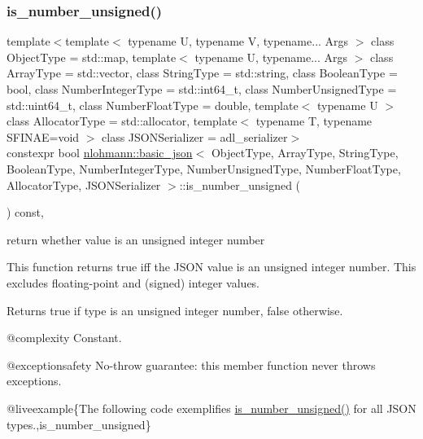 \subsubsection{\texorpdfstring{is\_number\_unsigned()}{is\_number\_unsigned()}}
{\footnotesize\ttfamily template$<$template$<$ typename U, typename V, typename... Args $>$ class Object\+Type = std\+::map, template$<$ typename U, typename... Args $>$ class Array\+Type = std\+::vector, class String\+Type  = std\+::string, class Boolean\+Type  = bool, class Number\+Integer\+Type  = std\+::int64\+\_\+t, class Number\+Unsigned\+Type  = std\+::uint64\+\_\+t, class Number\+Float\+Type  = double, template$<$ typename U $>$ class Allocator\+Type = std\+::allocator, template$<$ typename T, typename S\+F\+I\+N\+A\+E=void $>$ class J\+S\+O\+N\+Serializer = adl\+\_\+serializer$>$ \\
constexpr bool \mbox{\hyperlink{classnlohmann_1_1basic__json}{nlohmann\+::basic\+\_\+json}}$<$ Object\+Type, Array\+Type, String\+Type, Boolean\+Type, Number\+Integer\+Type, Number\+Unsigned\+Type, Number\+Float\+Type, Allocator\+Type, J\+S\+O\+N\+Serializer $>$\+::is\+\_\+number\+\_\+unsigned (\begin{DoxyParamCaption}{ }\end{DoxyParamCaption}) const\hspace{0.3cm}{\ttfamily [inline]}, {\ttfamily [noexcept]}}



return whether value is an unsigned integer number 

This function returns true iff the J\+S\+ON value is an unsigned integer number. This excludes floating-\/point and (signed) integer values.

\begin{DoxyReturn}{Returns}
{\ttfamily true} if type is an unsigned integer number, {\ttfamily false} otherwise.
\end{DoxyReturn}
@complexity Constant.

@exceptionsafety No-\/throw guarantee\+: this member function never throws exceptions.

@liveexample\{The following code exemplifies {\ttfamily \mbox{\hyperlink{classnlohmann_1_1basic__json_abc7378cba0613a78b9aad1c8e7044bb0}{is\+\_\+number\+\_\+unsigned()}}} for all J\+S\+ON types.,is\+\_\+number\+\_\+unsigned\}

